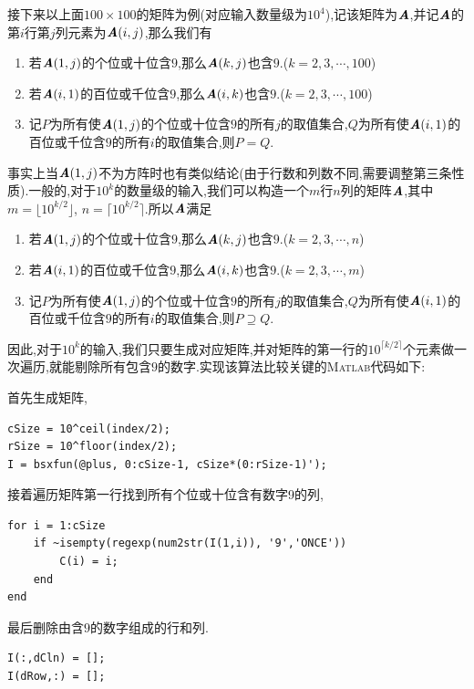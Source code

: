 \documentclass[a4paper,12pt]{article}
\begin{document}
\begin{CJK*}{UTF8}{gbsn}
接下来以上面$100\times100$的矩阵为例(对应输入数量级为$10^4$),记该矩阵为$\textrm{\textbf{\emph{A}}}$,并记$\textrm{\textbf{\emph{A}}}$的第$i$行第$j$列元素为$\textrm{\textbf{\emph{A}}}(i,j)$,那么我们有
\begin{enumerate}
\item 若$\textrm{\textbf{\emph{A}}}(1,j)$的个位或十位含$9$,那么$\textrm{\textbf{\emph{A}}}(k,j)$也含$9$.($k=2,3,\cdots,100$)
\item 若$\textrm{\textbf{\emph{A}}}(i,1)$的百位或千位含$9$,那么$\textrm{\textbf{\emph{A}}}(i,k)$也含$9$.($k=2,3,\cdots,100$)
\item 记$P$为所有使$\textrm{\textbf{\emph{A}}}(1,j)$的个位或十位含$9$的所有$j$的取值集合,$Q$为所有使$\textrm{\textbf{\emph{A}}}(i,1)$的百位或千位含$9$的所有$i$的取值集合,则$P=Q$.
\end{enumerate}\par

事实上当$\textrm{\textbf{\emph{A}}}(1,j)$不为方阵时也有类似结论(由于行数和列数不同,需要调整第三条性质).一般的,对于$10^k$的数量级的输入,我们可以构造一个$m$行$n$列的矩阵$\textrm{\textbf{\emph{A}}}$,其中$m=\lfloor 10^{k/2} \rfloor$, $n=\lceil 10^{k/2} \rceil$.所以$\textrm{\textbf{\emph{A}}}$满足

\begin{enumerate}
\item 若$\textrm{\textbf{\emph{A}}}(1,j)$的个位或十位含$9$,那么$\textrm{\textbf{\emph{A}}}(k,j)$也含$9$.($k=2,3,\cdots,n$)
\item 若$\textrm{\textbf{\emph{A}}}(i,1)$的百位或千位含$9$,那么$\textrm{\textbf{\emph{A}}}(i,k)$也含$9$.($k=2,3,\cdots,m$)
\item 记$P$为所有使$\textrm{\textbf{\emph{A}}}(1,j)$的个位或十位含$9$的所有$j$的取值集合,$Q$为所有使$\textrm{\textbf{\emph{A}}}(i,1)$的百位或千位含$9$的所有$i$的取值集合,则$P \supseteq Q$.
\end{enumerate}\par

因此,对于$10^k$的输入,我们只要生成对应矩阵,并对矩阵的第一行的$10^{\lceil k/2 \rceil}$个元素做一次遍历,就能剔除所有包含$9$的数字.实现该算法比较关键的\textsc{Matlab}代码如下:\par
\vspace{9pt}
\noindent 首先生成矩阵,
\vspace{-17pt}
\begin{lstlisting}
cSize = 10^ceil(index/2);
rSize = 10^floor(index/2);
I = bsxfun(@plus, 0:cSize-1, cSize*(0:rSize-1)');
\end{lstlisting}
\vspace{9pt}
接着遍历矩阵第一行找到所有个位或十位含有数字9的列,
\vspace{-17pt}
\begin{lstlisting}
for i = 1:cSize
    if ~isempty(regexp(num2str(I(1,i)), '9','ONCE'))
        C(i) = i;
    end
end
\end{lstlisting}
\vspace{9pt}
最后删除由含$9$的数字组成的行和列.
\vspace{-17pt}
\begin{lstlisting}
I(:,dCln) = [];
I(dRow,:) = [];
\end{lstlisting}
\vspace{9pt}


\end{CJK*}
\end{document}
